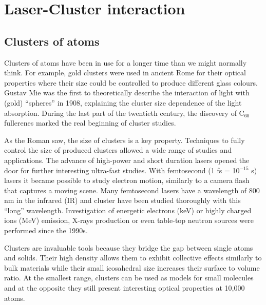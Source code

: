 
\section{Laser-Cluster interaction}

\subsection{Clusters of atoms}
Clusters of atoms have been in use for a longer time than we might normally
think. For example, gold clusters were used in ancient Rome for their optical
properties where their size could be controlled to produce different glass colours.
Gustav Mie was the first to theoretically describe the interaction of light
with (gold) ``spheres'' in 1908, explaining the cluster size dependence of the
light absorption. During the last part of the twentieth century, the discovery of
C$_{60}$ fullerenes marked the real beginning of cluster studies.

As the Roman saw, the size of clusters is a key property. Techniques to fully
control the size of produced clusters allowed a wide range of studies and
applications. The advance of high-power and short duration lasers opened the
door for further interesting ultra-fast studies. With femtosecond
(1 fs = 10$^{-15}$ s) lasers it became possible to study electron motion,
similarly to a camera flash that captures a moving scene. Many femtosecond lasers
have a wavelength of 800 nm in the infrared (IR) and cluster have been studied
thoroughly with this ``long'' wavelength. Investigation of energetic
electrons (keV) or highly charged ions (MeV) emission, X-rays production or even
table-top neutron sources were performed since the 1990s\cite{Haberland1994,Brabec2009}.

Clusters are invaluable tools because they bridge the gap between single atoms
and solids. Their high density allows them to exhibit collective effects similarly
to bulk materials while their small icosahedral\cite{Martin1996} size increases
their surface to volume ratio.
At the smallest range, clusters can be used as models for small molecules and
at the opposite they still present interesting optical properties at 10,000
atoms\cite{Reinhard2004}.

